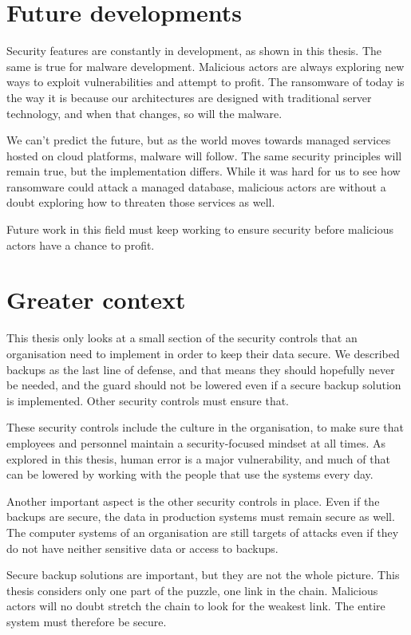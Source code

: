 \section{Future developments}
Security features are constantly in development, as shown in this thesis. The same is true for malware development. Malicious actors are always exploring new ways to exploit vulnerabilities and attempt to profit. The ransomware of today is the way it is because our architectures are designed with traditional server technology, and when that changes, so will the malware.

We can't predict the future, but as the world moves towards managed services hosted on cloud platforms, malware will follow. The same security principles will remain true, but the implementation differs. While it was hard for us to see how ransomware could attack a managed database, malicious actors are without a doubt exploring how to threaten those services as well. 

Future work in this field must keep working to ensure security before malicious actors have a chance to profit.





\section{Greater context}
This thesis only looks at a small section of the security controls that an organisation need to implement in order to keep their data secure. We described backups as the last line of defense, and that means they should hopefully never be needed, and the guard should not be lowered even if a secure backup solution is implemented. Other security controls must ensure that.

These security controls include the culture in the organisation, to make sure that employees and personnel maintain a security-focused mindset at all times. As explored in this thesis, human error is a major vulnerability, and much of that can be lowered by working with the people that use the systems every day.

Another important aspect is the other security controls in place. Even if the backups are secure, the data in production systems must remain secure as well. The computer systems of an organisation are still targets of attacks even if they do not have neither sensitive data or access to backups. 

Secure backup solutions are important, but they are not the whole picture. This thesis considers only one part of the puzzle, one link in the chain. Malicious actors will no doubt stretch the chain to look for the weakest link. The entire system must therefore be secure. 